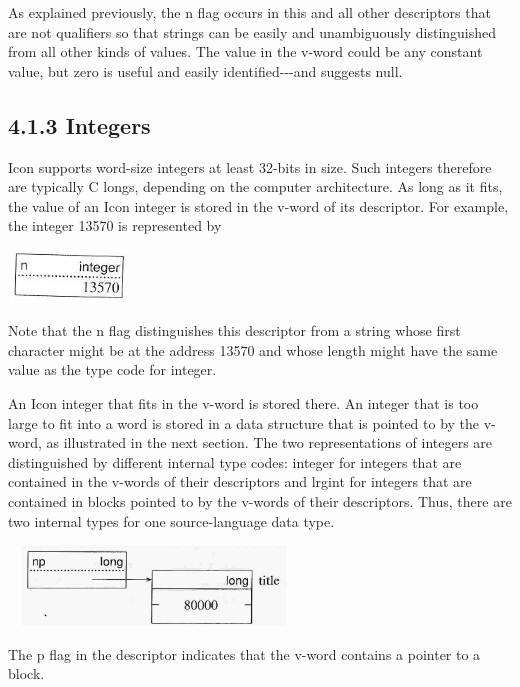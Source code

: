 As explained previously, the n flag occurs in this and all other
descriptors that are not qualifiers so that strings can be easily and
unambiguously distinguished from all other kinds of values. The value
in the v-word could be any constant value, but zero is useful and
easily identified-{}-{}-and suggests
{\textquotedbl}null.{\textquotedbl}

\subsection[4.1.3 Integers]{4.1.3 Integers}

Icon supports word-size integers at least 32-bits in size. Such
integers therefore are typically C longs, depending on the computer
architecture. As long as it fits, the value of an Icon integer is
stored in the v-word of its descriptor.  For example, the integer
13570 is represented by

\begin{center}
\includegraphics[width=1.2799in,height=0.5492in]{ib-img/ib-img009.jpg}
\end{center}

Note that the n flag distinguishes this descriptor from a string whose
first character might be at the address 13570 and whose length might
have the same value as the type code for integer.


An Icon integer that fits in the v-word is stored there. An integer
that is too large to fit into a word is stored in a data structure
that is pointed to by the v-word, as illustrated in the next
section. The two representations of integers are distinguished by
different internal type codes: integer for integers that are contained
in the v-words of their descriptors and lrgint for integers that are
contained in blocks pointed to by the v-words of their descriptors.
Thus, there are two internal types for one source-language data type.


\ \  \includegraphics[width=2.778in,height=0.8437in]{ib-img/ib-img010.jpg} 


The p flag in the descriptor indicates that the v-word contains a
pointer to a block.

